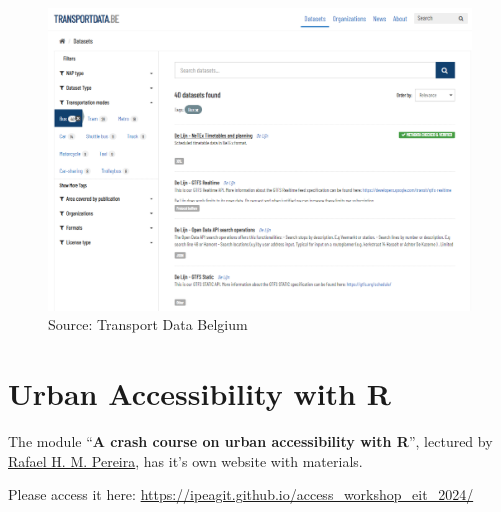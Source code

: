 \documentclass[
  letterpaper,
  DIV=11,
  numbers=noendperiod]{scrreprt}
\begin{document}
\begin{figure}[H]

{\centering \includegraphics{images/clipboard-3645209787.png}

}

\caption{Source: Transport Data Belgium}

\end{figure}%

\chapter{Urban Accessibility with R}\label{urban-accessibility-with-r}

The module ``\textbf{A crash course on urban accessibility with R}'',
lectured by
\href{https://ipeagit.github.io/access_workshop_eit_2024/\#about-the-instructor}{Rafael
H. M. Pereira}, has it's own website with materials.

\begin{tcolorbox}[enhanced jigsaw, breakable, left=2mm, colframe=quarto-callout-note-color-frame, leftrule=.75mm, bottomrule=.15mm, arc=.35mm, rightrule=.15mm, colback=white, opacityback=0, toprule=.15mm]
\begin{minipage}[t]{5.5mm}
\textcolor{quarto-callout-note-color}{\faInfo}
\end{minipage}%
\begin{minipage}[t]{\textwidth - 5.5mm}

Please access it here:
\url{https://ipeagit.github.io/access_workshop_eit_2024/}

\end{minipage}%
\end{tcolorbox}
\end{document}
